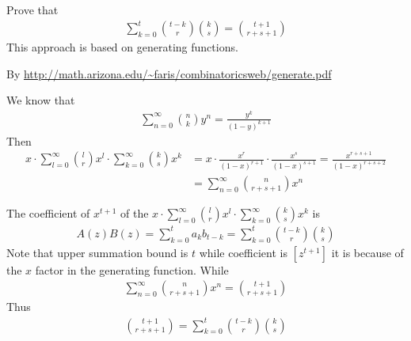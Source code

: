 ﻿\documentclass{article}
\begin{document}
    Prove that
    \begin{align*}
        \sum_{k=0}^{t} {t-k \choose r}{k \choose s}={t+1 \choose r+s+1}
    \end{align*}
    This approach is based on generating functions.

    By \url{http://math.arizona.edu/~faris/combinatoricsweb/generate.pdf}

    We know that
    \begin{align*}
        \sum_{n=0}^{\infty} \binom{n}{k} y^n = \frac{y^k}{(1-y)^{k+1}}
    \end{align*}
    Then
    \begin{align*}
        x \cdot \sum_{l=0}^{\infty} \binom{l}{r} x^l \cdot \sum_{k=0}^{\infty} \binom{k}{s} x^k
        &= x \cdot \frac{x^r}{(1-x)^{r+1}} \cdot \frac{x^s}{(1-x)^{s+1}} = \frac{x^{r+s+1}}{(1-x)^{r+s+2}} \\
        &= \sum_{n=0}^{\infty} \binom{n}{r+s+1} x^n
    \end{align*}

    The coefficient of $x^{t+1}$ of the $x \cdot \sum_{l=0}^{\infty} \binom{l}{r} x^l \cdot \sum_{k=0}^{\infty} \binom{k}{s} x^k$ is
    \begin{align*}
    [z^{t+1}]
        A(z) B(z) = \sum_{k=0}^{t} a_k b_{t-k} = \sum_{k=0}^{t} \binom{t-k}{r} \binom{k}{s}
    \end{align*}
    Note that upper summation bound is $t$ while coefficient is $[z^{t+1}]$ it is because of the $x$ factor in the generating function.
    While
    \begin{align*}
        [z^{t+1}] \sum_{n=0}^{\infty} \binom{n}{r+s+1} x^n = \binom{t+1}{r+s+1}
    \end{align*}
    Thus
    \begin{align*}
        \binom{t+1}{r+s+1} = \sum_{k=0}^{t} \binom{t-k}{r} \binom{k}{s}
    \end{align*}
\end{document}

